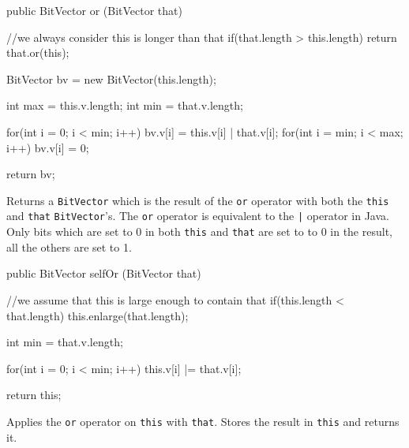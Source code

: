 \begin{htmlonly}
\end{htmlonly}
\begin{code}

   public BitVector or (BitVector that) \begin{hide} {
      //we always consider this is longer than that
      if(that.length > this.length)
         return that.or(this);

      BitVector bv = new BitVector(this.length);

      int max = this.v.length;
      int min = that.v.length;

      for(int i = 0; i < min; i++)
         bv.v[i] = this.v[i] | that.v[i];
      for(int i = min; i < max; i++)
         bv.v[i] = 0;

      return bv;
   } \end{hide}
\end{code}
\begin{tabb} Returns a \texttt{BitVector} which is the result of the \texttt{or}
  operator with both the \texttt{this} and \texttt{that} \texttt{BitVector}'s. The 
  \texttt{or} operator is equivalent to the \texttt{|} operator in Java. Only
  bits which are set to 0 in both \texttt{this} and \texttt{that} are set to to 0
  in the result, all the others are set to 1.
\end{tabb}
\begin{htmlonly}
\end{htmlonly}
\begin{code}

   public BitVector selfOr (BitVector that) \begin{hide} {
      //we assume that this is large enough to contain that
      if(this.length < that.length)
         this.enlarge(that.length);

      int min = that.v.length;

      for(int i = 0; i < min; i++)
         this.v[i] |= that.v[i];

      return this;
   } \end{hide}
\end{code}
\begin{tabb} Applies the \texttt{or} operator on \texttt{this} with \texttt{that}.
  Stores the result  in \texttt{this} and returns it.
\end{tabb}
